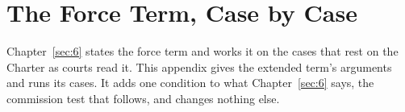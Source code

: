 \chapter{The Force Term, Case by Case}
\label{sec:B}
Chapter~\ref{sec:6} states the force term and works it on the cases that rest on the Charter as courts read it. This appendix gives the extended term's arguments and runs its cases. It adds one condition to what Chapter~\ref{sec:6} says, the commission test that follows, and changes nothing else.
